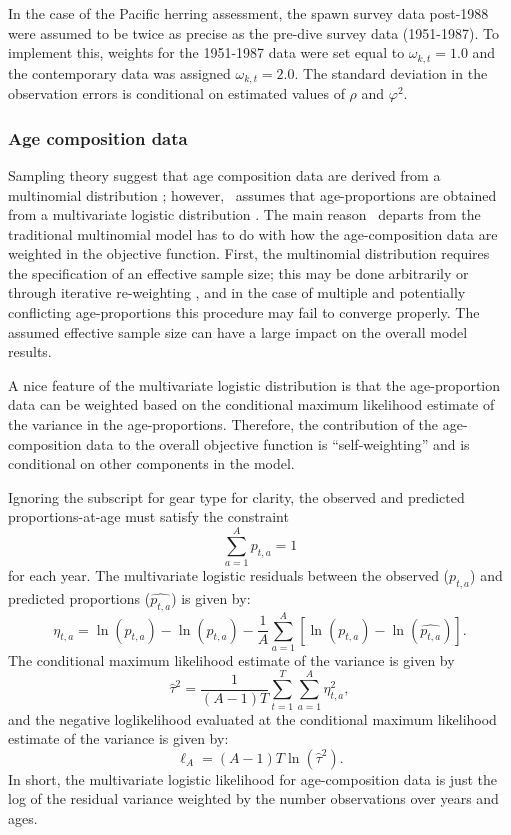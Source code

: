 In the case of the Pacific herring assessment, the spawn survey data post-1988 were assumed to be twice as precise as the pre-dive survey data (1951-1987).  To implement this, weights for the 1951-1987 data were set equal to $\omega_{k,t}=1.0$ and the contemporary data was assigned $\omega_{k,t}=2.0$.  The standard deviation in the observation errors is conditional on estimated values of $\rho$ and $\varphi^2$.


\subsubsection{Age composition data}\label{agecomps}
Sampling theory suggest that age composition data are derived from a multinomial distribution \citep{fournier1982general}; however, \iscam\ assumes that age-proportions are obtained from a multivariate logistic distribution \citep{schnute1995influence,richards1997visualizing}.  The main reason \iscam\ departs from the traditional multinomial model has to do with how the age-composition data are weighted in the objective function.  First, the multinomial distribution requires the specification of an effective sample size; this may be done arbitrarily or through iterative re-weighting \citep{MCALLISTER1997,gavaris2002sif}, and in the case of multiple and potentially conflicting age-proportions this procedure may fail to converge properly.  The assumed effective sample size can have a large impact on the overall model results.  

A nice feature of the multivariate logistic distribution is that the age-proportion data can be weighted based on the conditional maximum likelihood estimate of the variance in the age-proportions.  Therefore, the contribution of the age-composition data to the overall objective function is ``self-weighting'' and is conditional on other components in the model.

Ignoring the subscript for gear type for clarity, the observed and predicted proportions-at-age must satisfy the constraint 
\[
 \sum_{a=1}^A p_{t,a} = 1
\]
for each year. The multivariate logistic residuals between the observed ($p_{t,a}$) and predicted proportions ($\widehat{p_{t,a}}$) is given by:
\begin{equation}\label{eq7}
\eta_{t,a}=\ln(p_{t,a})-\ln(\widehat{p_{t,a}})-\frac{1}{A}\sum_{a=1}^A\left[\ln(p_{t,a})-\ln(\widehat{p_{t,a}}) \right].
\end{equation}
The conditional maximum likelihood estimate of the variance is given by
\[
\widehat{\tau}^2=\frac{1}{(A-1)T}\sum_{t=1}^T\sum_{a=1}^A \eta_{t,a}^2,
\]
and the negative loglikelihood evaluated at the conditional maximum likelihood estimate of the variance is given by:
\begin{equation}\label{eq8}
	\ell_A = (A-1)T \ln(\widehat{\tau}^2).
\end{equation}
In short, the multivariate logistic likelihood for age-composition data is just the log of the residual variance weighted by the number observations over years and ages.

